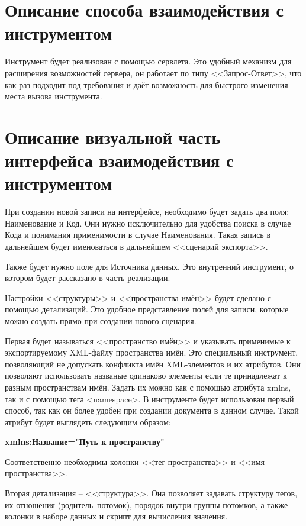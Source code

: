 \documentclass[a4paper,12pt]{diplom}
\begin{document}
\section{Описание способа взаимодействия с инструментом}

Инструмент будет реализован с помощью сервлета. Это удобный механизм для расширения возможностей сервера, он работает по типу <<Запрос-Ответ>>, что как раз подходит под требования и даёт возможность для быстрого изменения места вызова инструмента.

\section{Описание визуальной часть интерфейса взаимодействия с инструментом}

При создании новой записи на интерфейсе, необходимо будет задать два поля: Наименование и Код. Они нужно исключительно для удобства поиска в случае Кода и понимания применимости в случае Наименования. Такая запись в дальнейшем будет именоваться в дальнейшем <<сценарий экспорта>>.

Также будет нужно поле для Источника данных. Это внутренний инструмент, о котором будет рассказано в часть реализации.

Настройки <<структуры>> и <<пространства имён>> будет сделано с помощью детализаций. Это удобное представление полей для записи, которые можно создать прямо при создании нового сценария. 

Первая будет называться <<пространство имён>> и указывать применимые к экспортируемому XML-файлу пространства имён. Это специальный инструмент, позволяющий не допускать конфликта имён XML-элементов и их атрибутов. Они позволяют использовать названые одинаково элементы если те принадлежат к разным пространствам имён. Задать их можно как с помощью атрибута xmlns, так и с помощью тега <namespace>. В инструменте будет использован первый способ, так как он более удобен при создании документа в данном случае. Такой атрибут будет выглядеть следующим образом:

\medskip
\textbf{xmlns:Название="Путь к пространству"}
\medskip

Соответственно необходимы колонки <<тег пространства>> и <<имя пространства>>.

Вторая детализация -- <<структура>>. Она позволяет задавать структуру тегов, их отношения (родитель--потомок), порядок внутри группы потомков, а также колонки в наборе данных и скрипт для вычисления значения.
\end{document}

